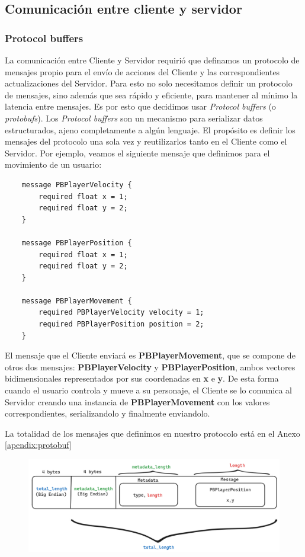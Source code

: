 \subsection{Comunicación entre cliente y servidor}

\subsubsection{Protocol buffers}

\noindent La comunicación entre Cliente y Servidor requirió que definamos un protocolo de mensajes propio para 
el envío de acciones del Cliente y las correspondientes actualizaciones del Servidor.
Para esto no solo necesitamos definir un protocolo de mensajes, sino además que sea rápido y eficiente, 
para mantener al mínimo la latencia entre mensajes.
Es por esto que decidimos usar \textit{Protocol buffers} (o \textit{protobufs}). Los 
\textit{Protocol buffers} son un mecanismo para serializar datos estructurados, ajeno completamente 
a algún lenguaje. El propósito es definir los mensajes del protocolo una sola vez y reutilizarlos 
tanto en el Cliente como el Servidor.
Por ejemplo, veamos el siguiente mensaje que definimos para el movimiento de un usuario:
\begin{verbatim}
    message PBPlayerVelocity {
        required float x = 1;
        required float y = 2;
    }

    message PBPlayerPosition {
        required float x = 1;
        required float y = 2;
    }

    message PBPlayerMovement {
        required PBPlayerVelocity velocity = 1;
        required PBPlayerPosition position = 2;
    }
\end{verbatim}

El mensaje que el Cliente enviará es \textbf{PBPlayerMovement}, que se compone de otros dos mensajes: 
\textbf{PBPlayerVelocity} y \textbf{PBPlayerPosition}, ambos vectores bidimensionales representados 
por sus coordenadas en \textbf{x} e \textbf{y}. De esta forma cuando el usuario controla y mueve a 
su personaje, el Cliente se lo comunica al Servidor creando una instancia de \textbf{PBPlayerMovement} 
con los valores correspondientes, serializandolo y finalmente enviandolo.


La totalidad de los mensajes que definimos en nuestro protocolo está en el Anexo \ref{apendix:protobuf}

\begin{figure}[htbp]
    \centering
    \includegraphics[width=1.0\textwidth]{../assets/protobuf.png}
\end{figure}

